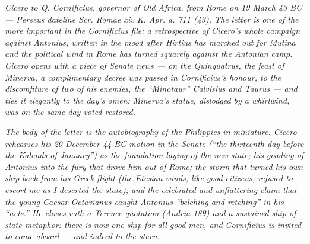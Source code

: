 
\textit{Cicero to Q. Cornificius, governor of Old Africa, from Rome
on 19 March 43 BC --- Perseus dateline \textit{Scr. Romae xiv K. Apr.
a. 711 (43)}. The letter is one of the more important in the
Cornificius file: a retrospective of Cicero's whole campaign against
Antonius, written in the mood after Hirtius has marched out for Mutina
and the political wind in Rome has turned squarely against the
Antonian camp. Cicero opens with a piece of Senate news --- on the
Quinquatrus, the feast of Minerva, a complimentary decree was passed
in Cornificius's honour, to the discomfiture of two of his enemies,
the ``Minotaur'' Calvisius and Taurus --- and ties it elegantly to
the day's omen: Minerva's statue, dislodged by a whirlwind, was on
the same day voted restored.}

\textit{The body of the letter is the autobiography of the Philippics
in miniature. Cicero rehearses his 20 December 44 BC motion in the
Senate (``the thirteenth day before the Kalends of January'') as the
foundation laying of the new state; his goading of Antonius into the
fury that drove him out of Rome; the storm that turned his own ship
back from his Greek flight (\emph{the Etesian winds, like good
citizens, refused to escort me as I deserted the state}); and the
celebrated and unflattering claim that the young Caesar Octavianus
caught Antonius ``belching and retching'' in his ``nets.'' He closes
with a Terence quotation (\emph{Andria} 189) and a sustained
ship-of-state metaphor: there is now one ship for all good men, and
Cornificius is invited to come aboard --- and indeed to the stern.}
